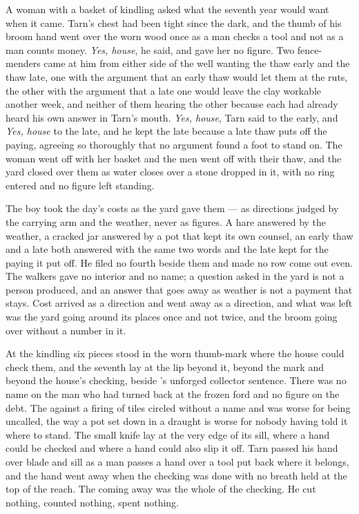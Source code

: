 A woman with a basket of kindling asked what the seventh year would want when it came. Tarn's chest had been tight since the dark, and the thumb of his broom hand went over the worn wood once as a man checks a tool and not as a man counts money. \emph{Yes, house}, he said, and gave her no figure. Two fence-menders came at him from either side of the well wanting the thaw early and the thaw late, one with the argument that an early thaw would let them at the ruts, the other with the argument that a late one would leave the clay workable another week, and neither of them hearing the other because each had already heard his own answer in Tarn's mouth. \emph{Yes, house}, Tarn said to the early, and \emph{Yes, house} to the late, and he kept the late because a late thaw puts off the paying, agreeing so thoroughly that no argument found a foot to stand on. The woman went off with her basket and the men went off with their thaw, and the yard closed over them as water closes over a stone dropped in it, with no ring entered and no figure left standing.

The boy took the day's costs as the yard gave them --- as directions judged by the carrying arm and the weather, never as figures. A hare answered by the weather, a cracked jar answered by a pot that kept its own counsel, an early thaw and a late both answered with the same two words and the late kept for the paying it put off. He filed no fourth beside them and made no row come out even. The walkers gave no interior and no name; a question asked in the yard is not a person produced, and an answer that goes away as weather is not a payment that stays. Cost arrived as a direction and went away as a direction, and what was left was the yard going around its places once and not twice, and the broom going over  without a number in it.

\scenebreak

At the kindling six pieces stood in the worn thumb-mark where the house could check them, and the seventh lay at the lip beyond it, beyond the mark and beyond the house's checking, beside 's unforged collector sentence. There was no name on the man who had turned back at the frozen ford and no figure on the debt. The  against a firing of tiles circled without a name and was worse for being uncalled, the way a pot set down in a draught is worse for nobody having told it where to stand. The small knife lay at the very edge of its sill, where a hand could be checked and where a hand could also slip it off. Tarn passed his hand over blade and sill as a man passes a hand over a tool put back where it belongs, and the hand went away when the checking was done with no breath held at the top of the reach. The coming away was the whole of the checking. He cut nothing, counted nothing, spent nothing.

